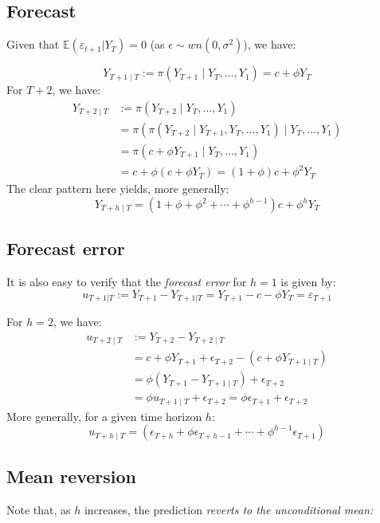 \documentclass[11pt, a4paper]{report}
\theoremstyle{plain}
\theoremstyle{plain}
\theoremstyle{remark}
\begin{document}
\subsection{Forecast}

Given that $\mathbb{E}(\varepsilon_{t+1}|Y_T) = 0$ (as $\epsilon \sim wn(0, \sigma^2)$), we have: 

$$
Y_{T+1 \mid T}:=\pi\left(Y_{T+1} \mid Y_{T}, \ldots, Y_{1}\right)=c+\phi Y_{T}
$$
For $T+2$, we have:
$$
\begin{aligned}
	Y_{T+2 \mid T} &:=\pi\left(Y_{T+2} \mid Y_{T}, \ldots, Y_{1}\right) \\
	&=\pi\left(\pi\left(Y_{T+2} \mid Y_{T+1}, Y_{T}, \ldots, Y_{1}\right) \mid Y_{T}, \ldots, Y_{1}\right) \\
	&=\pi\left(c+\phi Y_{T+1} \mid Y_{T}, \ldots, Y_{1}\right) \\
	&=c+\phi\left(c+\phi Y_{T}\right)=(1+\phi) c+\phi^{2} Y_{T}
\end{aligned}
$$
The clear pattern here yields, more generally:
$$
Y_{T+h \mid T}=\left(1+\phi+\phi^{2}+\cdots+\phi^{h-1}\right) c+\phi^{h} Y_{T}
$$

\subsection{Forecast error}

It is also easy to verify that the \textit{forecast error} for $h=1$ is given by:
$$ u_{T+1|T} := Y_{T+1} - Y_{T+1|T} = Y_{T+1} - c - \phi Y_T = \varepsilon_{T+1} $$
 
For $h=2$, we have:
$$
\begin{aligned}
 u_{T+2 \mid T} &:=Y_{T+2}-Y_{T+2 \mid T} \\
 &=c+\phi Y_{T+1}+\epsilon_{T+2}-\left(c+\phi Y_{T+1 \mid T}\right) \\
 &=\phi\left(Y_{T+1}-Y_{T+1 \mid T}\right)+\epsilon_{T+2} \\
 &=\phi u_{T+1 \mid T}+\epsilon_{T+2}=\phi \epsilon_{T+1}+\epsilon_{T+2}
\end{aligned}
$$
More generally, for a given time horizon $h$:
$$
u_{T+h \mid T}=\left(\epsilon_{T+h}+\phi \epsilon_{T+h-1}+\cdots+\phi^{h-1} \epsilon_{T+1}\right)$$

\subsection{Mean reversion}

Note that, as $h$ increases, the prediction \textit{reverts to the unconditional mean:}
\end{document}
